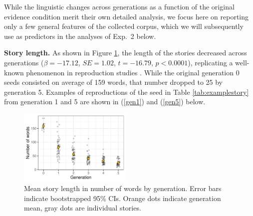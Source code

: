 \documentclass[10pt,letterpaper]{article}
\newcommand{\jd}[1]{\textcolor{Green}{[jd: #1]}}
\begin{document}
While the linguistic changes across generations as a function of the original evidence condition merit their own detailed analysis, we focus here on reporting only a few general features of the collected corpus, which we will subsequently use as predictors in the analyses of Exp.~2 below.

\textbf{Story length.} As shown in Figure \ref{fig:storylength}, the length of the stories decreased across generations ($\beta = -17.12$, $SE = 1.02$, $t = -16.79$, $p < 0.0001$), replicating a well-known phenomenon in reproduction studies \cite{Bartlett:1932}. While the original generation 0 seeds consisted on average of 159 words, that number dropped to 25 by generation 5. Examples of reproductions of the seed in Table \ref{tab:examplestory} from generation 1 and 5 are shown in (\ref{gen1}) and (\ref{gen5}) below.



\begin{figure}[]
	\includegraphics[width=0.48\textwidth]{graphs/corpus_length.pdf}
	\caption{Mean story length in number of words by generation. Error bars indicate bootstrapped 95\% CIs. Orange dots indicate generation mean, gray dots are individual stories.} 
	\label{fig:storylength}
\end{figure}
\end{document}
